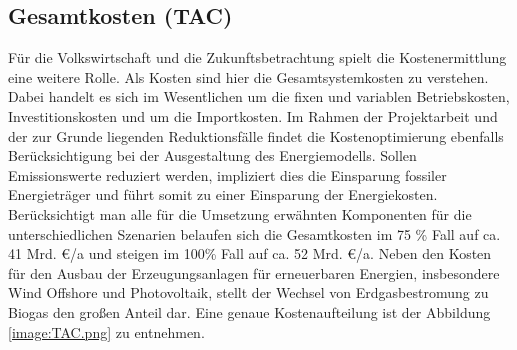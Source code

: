 \subsection{Gesamtkosten (TAC)}
Für die Volkswirtschaft und die Zukunftsbetrachtung spielt die Kostenermittlung eine weitere Rolle. Als Kosten sind hier die Gesamtsystemkosten zu verstehen. Dabei handelt es sich im Wesentlichen um die fixen und variablen Betriebskosten, Investitionskosten und um die Importkosten. Im Rahmen der Projektarbeit und der zur Grunde liegenden Reduktionsfälle findet die Kostenoptimierung ebenfalls Berücksichtigung bei der Ausgestaltung des Energiemodells. Sollen Emissionswerte reduziert werden, impliziert dies die Einsparung fossiler Energieträger und führt somit zu einer Einsparung der Energiekosten. Berücksichtigt man alle für die Umsetzung erwähnten Komponenten für die unterschiedlichen Szenarien belaufen sich die Gesamtkosten im 75 \% Fall auf ca. 41 Mrd. €/a und steigen im 100\% Fall auf ca. 52 Mrd. €/a. Neben den Kosten für den Ausbau der Erzeugungsanlagen für erneuerbaren Energien, insbesondere Wind Offshore und Photovoltaik, stellt der Wechsel von Erdgasbestromung zu Biogas den großen Anteil dar. Eine genaue Kostenaufteilung ist der Abbildung \ref{image:TAC.png} zu entnehmen. 


